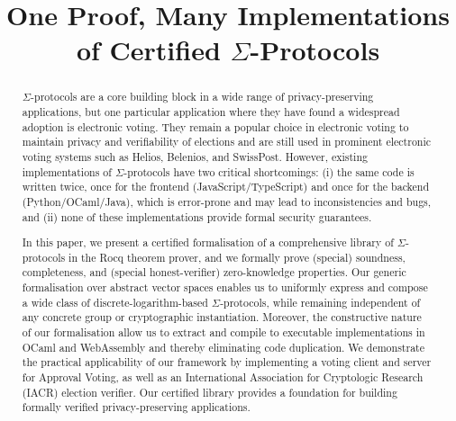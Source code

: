 \documentclass[sigconf, anonymous]{acmart}
\begin{document}
\title{One Proof, Many Implementations of Certified $\Sigma$-Protocols}




\begin{abstract}
  $\Sigma$-protocols are a core building block in a wide range of privacy-preserving applications, but 
  one particular application where they have found a widespread adoption is electronic voting.
  They remain a popular choice in electronic voting to maintain privacy 
  and verifiability of elections and are still used in prominent electronic voting systems such as 
  Helios, Belenios, and SwissPost. However, existing implementations of $\Sigma$-protocols have two 
  critical shortcomings: (i) the same code is written twice, once for the frontend (JavaScript/TypeScript)
  and once for the backend (Python/OCaml/Java), which is error-prone and may lead to inconsistencies and bugs, and (ii) none of these implementations provide formal security guarantees.
  
  In this paper, we present a certified formalisation of a comprehensive library of $\Sigma$-protocols 
  in the Rocq theorem prover, and we formally prove (special) soundness, completeness, and 
  (special honest-verifier) zero-knowledge properties. Our generic formalisation over abstract vector spaces enables us to uniformly express and compose a wide class of discrete-logarithm-based $\Sigma$-protocols, while remaining independent of any concrete group or cryptographic instantiation. Moreover, the constructive nature of our formalisation allow us to extract and compile to executable implementations in OCaml and WebAssembly and thereby
  eliminating code duplication. We demonstrate the practical applicability of our framework by implementing a voting client and server for Approval Voting, as well as an International Association for Cryptologic Research (IACR) election verifier. Our certified library provides a foundation for 
  building formally verified privacy-preserving applications. 


 


\end{abstract}
\end{document}
